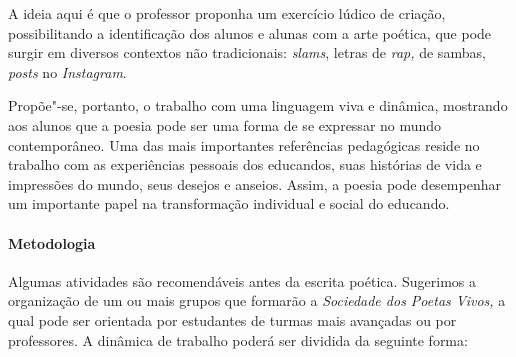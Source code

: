 \documentclass[11pt]{extarticle}
\begin{document}

A ideia aqui é que o professor proponha um exercício lúdico de criação,
possibilitando a identificação dos alunos e alunas com a arte poética,
que pode surgir em diversos contextos não tradicionais: \emph{slams},
letras de \emph{rap,} de sambas, \emph{posts} no \emph{Instagram}.

Propõe"-se, portanto, o trabalho com uma linguagem viva e dinâmica,
mostrando aos alunos que a poesia pode ser uma forma de se expressar no
mundo contemporâneo. Uma das mais importantes referências pedagógicas
reside no trabalho com as experiências pessoais dos educandos, suas
histórias de vida e impressões do mundo, seus desejos e anseios. Assim,
a poesia pode desempenhar um importante papel na transformação
individual e social do educando.

\paragraph{Metodologia}

Algumas atividades são recomendáveis antes da escrita poética. Sugerimos
a organização de um ou mais grupos que formarão a \emph{Sociedade dos
Poetas Vivos,} a qual pode ser orientada por estudantes de turmas mais
avançadas ou por professores. A dinâmica de trabalho poderá ser dividida
da seguinte forma:
\end{document}
